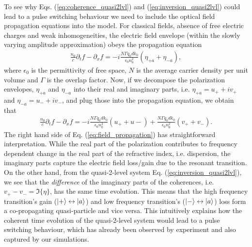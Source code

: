 \documentclass[]{spie}  %
\def\p{\partial}
\begin{document}
To see why Eqs. (\ref{eq:coherence_quasi2lvl}) and (\ref{eq:inversion_quasi2lvl}) could lead to a pulse switching behaviour we need to include the optical field propagation equations into the model. For classical fields, absence of free electric charges and weak inhomogeneities, the electric field envelope (within the slowly varying amplitude approximation) obeys the propagation equation \cite{jirauschek2014modeling}
\begin{align}
	\frac{n_0}{c} \p_t f - \p_x f = -i\frac{N \Gamma q_0d k_0}{\epsilon_0 n_0^2}(\eta_{+a}+\eta_{-a}),
\end{align}
where $\epsilon_0$ is the permittivity of free space, $N$ is the average carrier density per unit volume and $\Gamma$ is the overlap factor. Now, if we decompose the polarization envelopes, $\eta_{+a}$ and $\eta_{-a}$ into their real and imaginary parts, i.e. $\eta_{+a} = u_{+}+iv_{+}$ and $\eta_{-a} = u_{-}+iv_{-}$, and plug those into the propagation equation, we obtain that
\begin{align}
\label{eq:field_propagation}
\frac{n_0}{c} \p_t f - \p_x f = -i\frac{N \Gamma q_0d k_0}{\epsilon_0 n_0^2}(u_{+}+u{-}) + \frac{N \Gamma q_0d k_0}{\epsilon_0 n_0^2}(v_{+}+v_{-}).
\end{align}
The right hand side of Eq. (\ref{eq:field_propagation}) has straightforward interpretation. While the real part of the polarization contributes to frequency dependent change in the real part of the refractive index, i.e. dispersion, the imaginary parts capture the electric field loss/gain due to the resonant transition. On the other hand, from the quasi-2-level system Eq. (\ref{eq:inversion_quasi2lvl}), we see that the \emph{difference} of the imaginary parts of the coherences, i.e. $v_{+}-v_{-} = \Im\{\eta\}$, has the same time evolution. This means that the high frequency transition's gain ($\ket{+}\leftrightarrow\ket{a}$) and low frequency transition's ($\ket{-}\leftrightarrow\ket{a}$) loss form a co-propagating quasi-particle and vice versa. This intuitively explains how the coherent time evolution of the quasi-2-level system would lead to a pulse switching behaviour, which has already been observed by experiment\cite{burghoff2015evaluating} and also captured by our simulations.
\end{document}
